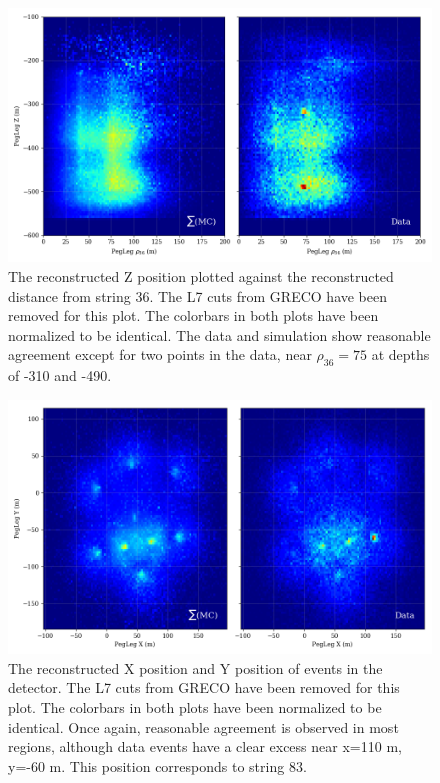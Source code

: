 \begin{center}
\label{fig:flaring_zrho}
\begin{figure}
	\includegraphics[width=0.9\linewidth]{pegleg_fine_z_rho.png}
\caption{The reconstructed Z position plotted against the reconstructed distance from string 36. The L7 cuts from GRECO have been removed for this plot. The colorbars in both plots have been normalized to be identical. The data and simulation show reasonable agreement except for two points in the data, near ${\rho_{36}=75}$ at depths of -310 and -490. }
\end{figure}
\end{center}

\begin{center}
\label{fig:flaring_xy}
\begin{figure}
	\includegraphics[width=0.9\linewidth]{pegleg_fine_x_y.png}
\caption{The reconstructed X position and Y position of events in the detector. The L7 cuts from GRECO have been removed for this plot. The colorbars in both plots have been normalized to be identical. Once again, reasonable agreement is observed in most regions, although data events have a clear excess near x=110 m, y=-60 m. This position corresponds to string 83.}
\end{figure}
\end{center}

